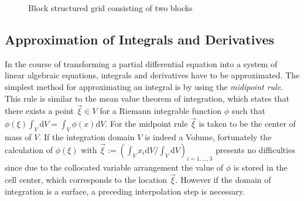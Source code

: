     \begin{figure}[h]
      \label{fig:blockstruc}
      \qquad
      \caption{Block structured grid consisting of two blocks}
     \end{figure}
    
    \subsection{Approximation of Integrals and Derivatives}

    In the course of transforming a partial differential equation into a system of linear algebraic equations, integrals and derivatives have to be approximated. The simplest method for approximating an integral is by using the \textit{midipoint rule}. This rule is similar to the mean value theorem of integration, which states that there exists a point \(\vec{\xi} \in V\) for a Riemann integrable function \(\phi\) such that \(\phi(\xi) \int_V \mathrm{d}V = \int_V \phi(x) \mathrm{d}V\). For the midpoint rule \(\vec{\xi}\) is taken to be the center of mass of \(V\). If the integration domain \(V\) is indeed a Volume, fortunately the calculation of \(\phi(\mathbb{\xi})\) with \(\vec{\xi} := \left({ \int_V x_i \mathrm{d}V }/{ \int_V \mathrm{d}V } \right)_{i = 1,\dots,3}\) presents no difficulties since due to the collocated variable arrangement the value of \(\phi\) is stored in the cell center, which corresponds to the location \(\vec{\xi}\). However if the domain of integration is a surface, a preceding interpolation step is necessary.

